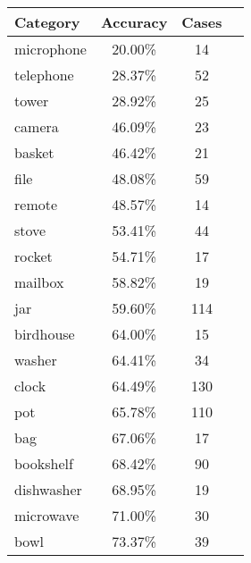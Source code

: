\begin{table}[]
	\centering
	\begin{tabular}[t]{lccl}
		\hline
		\textbf{Category} & \textbf{Accuracy} & \textbf{Cases} & \hspace{4pt} \\ \hline
		microphone        & 20.00\%           & 14             &              \\
		telephone         & 28.37\%           & 52             &              \\
		tower             & 28.92\%           & 25             &              \\
		camera            & 46.09\%           & 23             &              \\
		basket            & 46.42\%           & 21             &              \\
		file              & 48.08\%           & 59             &              \\
		remote            & 48.57\%           & 14             &              \\
		stove             & 53.41\%           & 44             &              \\
		rocket            & 54.71\%           & 17             &              \\
		mailbox           & 58.82\%           & 19             &              \\
		jar               & 59.60\%           & 114            &              \\
		birdhouse         & 64.00\%           & 15             &              \\
		washer            & 64.41\%           & 34             &              \\
		clock             & 64.49\%           & 130            &              \\
		pot               & 65.78\%           & 110            &              \\
		bag               & 67.06\%           & 17             &              \\
		bookshelf         & 68.42\%           & 90             &              \\
		dishwasher        & 68.95\%           & 19             &              \\
		microwave         & 71.00\%           & 30             &              \\
		bowl              & 73.37\%           & 39             &              \\

\end{tabular}
\end{table}
